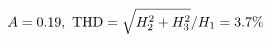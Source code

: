 \documentclass[preview]{standalone}
\begin{document}
\begin{align*}
\special{dvisvgm:raw <g id='unique000'>}A=0.19,\ \text{THD}=\sqrt{H_2^2+H_3^2}/H_1=3.7\%\special{dvisvgm:raw </g>}
\end{align*}
\end{document}
